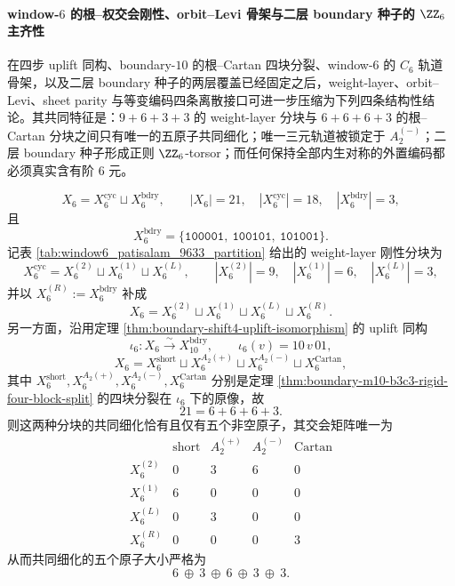 \paragraph{window-\texorpdfstring{$6$}{6} 的根--权交会刚性、orbit--Levi 骨架与二层 boundary 种子的 \texorpdfstring{$\ZZ_6$}{Z6} 主齐性}
在四步 uplift 同构、boundary-\(10\) 的根--Cartan 四块分裂、window-\(6\) 的 \(C_6\) 轨道骨架，以及二层 boundary 种子的两层覆盖已经固定之后，weight-layer、orbit--Levi、sheet parity 与等变编码四条离散接口可进一步压缩为下列四条结构性结论。其共同特征是：\(9+6+3+3\) 的 weight-layer 分块与 \(6+6+6+3\) 的根--Cartan 分块之间只有唯一的五原子共同细化；唯一三元轨道被锁定于 \(A_2^{(-)}\)；二层 boundary 种子形成正则 \(\ZZ_6\)-torsor；而任何保持全部内生对称的外置编码都必须真实含有阶 \(6\) 元。

\begin{theorem}\label{thm:xi-time-part53da-root-weight-common-refinement-five-atoms}
\[
X_6=X_6^{\mathrm{cyc}}\sqcup X_6^{\mathrm{bdry}},
\qquad
|X_6|=21,\quad |X_6^{\mathrm{cyc}}|=18,\quad |X_6^{\mathrm{bdry}}|=3,
\]
且
\[
X_6^{\mathrm{bdry}}
=
\{\texttt{100001},\ \texttt{100101},\ \texttt{101001}\}.
\]
记表 \ref{tab:window6_patisalam_9633_partition} 给出的 weight-layer 刚性分块为
\[
X_6^{\mathrm{cyc}}
=
X_6^{(2)}\sqcup X_6^{(1)}\sqcup X_6^{(L)},
\qquad
|X_6^{(2)}|=9,\quad |X_6^{(1)}|=6,\quad |X_6^{(L)}|=3,
\]
并以 \(X_6^{(R)}:=X_6^{\mathrm{bdry}}\) 补成
\[
X_6=X_6^{(2)}\sqcup X_6^{(1)}\sqcup X_6^{(L)}\sqcup X_6^{(R)}.
\]
另一方面，沿用定理 \ref{thm:boundary-shift4-uplift-isomorphism} 的 uplift 同构
\[
\iota_6:X_6\xrightarrow{\sim}X_{10}^{\mathrm{bdry}},
\qquad
\iota_6(v)=10\,v\,01,
\]
\[
X_6
=
X_6^{\mathrm{short}}
\sqcup
X_6^{A_2(+)}
\sqcup
X_6^{A_2(-)}
\sqcup
X_6^{\mathrm{Cartan}},
\]
其中 \(X_6^{\mathrm{short}},X_6^{A_2(+)},X_6^{A_2(-)},X_6^{\mathrm{Cartan}}\) 分别是定理 \ref{thm:boundary-m10-b3c3-rigid-four-block-split} 的四块分裂在 \(\iota_6\) 下的原像，故
\[
21=6+6+6+3.
\]
则这两种分块的共同细化恰有且仅有五个非空原子，其交会矩阵唯一为
\[
\begin{array}{c|cccc}
& \mathrm{short} & A_2^{(+)} & A_2^{(-)} & \mathrm{Cartan}\\
\hline
X_6^{(2)} & 0 & 3 & 6 & 0\\
X_6^{(1)} & 6 & 0 & 0 & 0\\
X_6^{(L)} & 0 & 3 & 0 & 0\\
X_6^{(R)} & 0 & 0 & 0 & 3
\end{array}
\]
从而共同细化的五个原子大小严格为
\[
6\ \oplus\ 3\ \oplus\ 6\ \oplus\ 3\ \oplus\ 3.
\]
\end{theorem}
